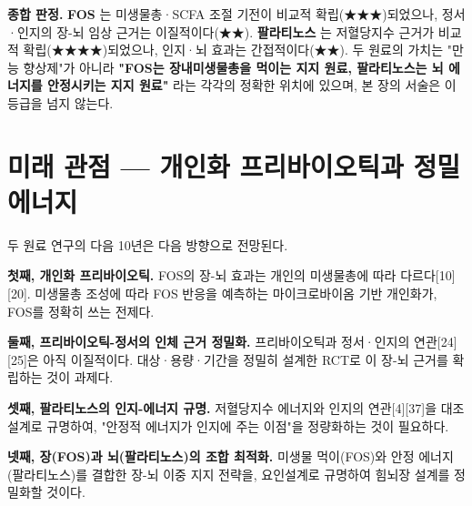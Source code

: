 \documentclass[11pt,oneside]{book}
\begin{document}
\vspace{2pt}\vspace{3pt}

\textbf{종합 판정.} \textbf{FOS} 는 미생물총·SCFA 조절 기전이 비교적 확립(★★★)되었으나, 정서·인지의 장-뇌 임상 근거는 이질적이다(★★). \textbf{팔라티노스} 는 저혈당지수 근거가 비교적 확립(★★★★)되었으나, 인지·뇌 효과는 간접적이다(★★). 두 원료의 가치는 "만능 향상제"가 아니라 \textbf{"FOS는 장내미생물총을 먹이는 지지 원료, 팔라티노스는 뇌 에너지를 안정시키는 지지 원료"} 라는 각각의 정확한 위치에 있으며, 본 장의 서술은 이 등급을 넘지 않는다.

\section{미래 관점 — 개인화 프리바이오틱과 정밀 에너지}
두 원료 연구의 다음 10년은 다음 방향으로 전망된다.

\textbf{첫째, 개인화 프리바이오틱.} FOS의 장-뇌 효과는 개인의 미생물총에 따라 다르다[10][20]. 미생물총 조성에 따라 FOS 반응을 예측하는 마이크로바이옴 기반 개인화가, FOS를 정확히 쓰는 전제다.

\textbf{둘째, 프리바이오틱-정서의 인체 근거 정밀화.} 프리바이오틱과 정서·인지의 연관[24][25]은 아직 이질적이다. 대상·용량·기간을 정밀히 설계한 RCT로 이 장-뇌 근거를 확립하는 것이 과제다.

\textbf{셋째, 팔라티노스의 인지-에너지 규명.} 저혈당지수 에너지와 인지의 연관[4][37]을 대조 설계로 규명하여, "안정적 에너지가 인지에 주는 이점"을 정량화하는 것이 필요하다.

\textbf{넷째, 장(FOS)과 뇌(팔라티노스)의 조합 최적화.} 미생물 먹이(FOS)와 안정 에너지(팔라티노스)를 결합한 장-뇌 이중 지지 전략을, 요인설계로 규명하여 힘뇌장 설계를 정밀화할 것이다.
\end{document}
